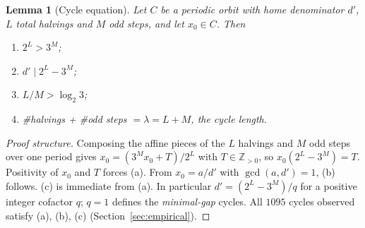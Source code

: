 \documentclass[11pt]{article}
\newtheorem{lemma}[theorem]{Lemma}
\theoremstyle{remark}
\begin{document}
\begin{lemma}[Cycle equation]\label{lem:cycle}
Let \(C\) be a periodic orbit with home denominator \(d'\), \(L\) total halvings
and \(M\) odd steps, and let \(x_0 \in C\). Then
\begin{enumerate}
  \item[(a)] \(2^{L} > 3^{M}\);
  \item[(b)] \(d' \mid 2^{L} - 3^{M}\);
  \item[(c)] \(L/M > \log_2 3\);
  \item[(d)] \#halvings + \#odd steps \(= \lambda = L + M\), the cycle length.
\end{enumerate}
\end{lemma}
\begin{proof}[Proof structure]
Composing the affine pieces of the \(L\) halvings and \(M\) odd steps over one
period gives \(x_0 = (3^{M} x_0 + T)/2^{L}\) with \(T \in \mathbb{Z}_{>0}\), so
\(x_0 (2^{L} - 3^{M}) = T\). Positivity of \(x_0\) and \(T\) forces (a). From
\(x_0 = a/d'\) with \(\gcd(a, d') = 1\), (b) follows. (c) is immediate from (a).
In particular \(d' = (2^{L} - 3^{M})/q\) for a positive integer cofactor \(q\);
\(q = 1\) defines the \emph{minimal-gap} cycles. All \(1095\) cycles observed
satisfy (a), (b), (c) (Section~\ref{sec:empirical}).
\end{proof}
\end{document}
